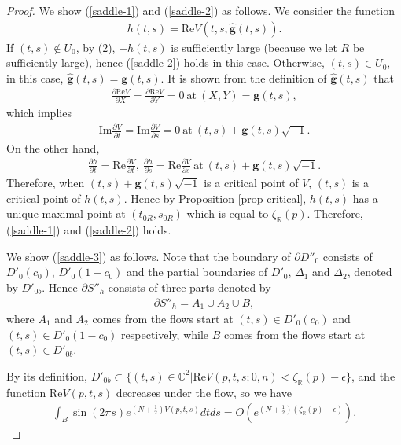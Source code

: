 \documentclass[12pt]{amsart}
\begin{document}
\begin{proof}
We show (\ref{saddle-1}) and (\ref{saddle-2}) as follows. We consider the function
\begin{align}
    h(t,s)=\text{Re} V(t,s,\hat{\mathbf{g}}(t,s)). 
\end{align}
If $(t,s)\notin U_0$, by (2), $-h(t,s)$ is sufficiently large (because we let $R$ be sufficiently large), hence (\ref{saddle-2}) holds in this case. Otherwise, $(t,s)\in U_0$, in this case, $\hat{\mathbf{g}}(t,s)=\mathbf{g}(t,s)$. It is shown from the definition of $\hat{\mathbf{g}}(t,s)$ that 
\begin{align}
    \frac{\partial \text{Re} V}{\partial X}=\frac{\partial \text{Re} V}{\partial Y}=0 \ \text{at} \ (X,Y)=\mathbf{g}(t,s),
\end{align}
which implies 
\begin{align}
    \text{Im}\frac{\partial V}{\partial t}=\text{Im} \frac{\partial V}{\partial s}=0 \ \text{at} \ (t,s)+\mathbf{g}(t,s)\sqrt{-1}.
\end{align}
On the other hand, 
    \begin{align}
        \frac{\partial h}{\partial t}=\text{Re}\frac{\partial V}{\partial t}, \ \frac{\partial h}{\partial s}=\text{Re} \frac{\partial V}{\partial s} \ \text{at} \ (t,s)+\mathbf{g}(t,s)\sqrt{-1}.
    \end{align}
Therefore, when  $(t,s)+\mathbf{g}(t,s)\sqrt{-1}$ is a critical point of $V$, $(t,s)$ is a critical point of $h(t,s)$. Hence by Proposition \ref{prop-critical}, $h(t,s)$ has a unique maximal point at $(t_{0R},s_{0R})$ which is equal to $\zeta_{\mathbb{R}}(p)$. Therefore, (\ref{saddle-1}) and (\ref{saddle-2}) holds. 


We show (\ref{saddle-3}) as follows. Note that the boundary of $\partial D''_0$ consists of $D'_0(c_{0})$, $D'_0(1-c_{0})$ and the partial boundaries of $D'_0$, $\Delta_1$ and $\Delta_2$, denoted by $D'_{0b}$.  Hence $\partial S''_{h}$ consists of three parts denoted by 
\begin{align}
    \partial S''_{h}=A_1\cup A_2\cup B,
\end{align}
where $A_1$ and $A_2$ comes from the flows start at $(t,s)\in D'_0(c_{0})$ and  $(t,s)\in D'_0(1-c_{0})$ respectively, while $B$ comes from the flows start at $(t,s)\in D'_{0b}$.

By its definition, $D'_{0b}\subset \{(t,s)\in \mathbb{C}^2|\text{Re} V(p,t,s;0,n)<\zeta_\mathbb{R}(p)-\epsilon\}$, and the function $\text{Re} V(p,t,s)$ decreases under the flow, so we have 
\begin{align} \label{formula-integralB2}
    \int_{B}\sin(2\pi s)e^{(N+\frac{1}{2})V(p,t,s)}dtds=O(e^{(N+\frac{1}{2})(\zeta_\mathbb{R}(p)-\epsilon)}).
\end{align}



\end{proof}
\end{document}
